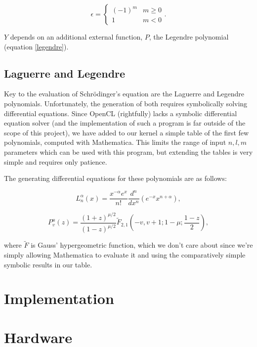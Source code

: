 \documentclass{acmsiggraph}
\begin{document}
\begin{equation}\label{yEpsilon}
\epsilon=\begin{cases}
\left(-1\right)^m & \text{$m\ge0$} \\
1 & \text{$m<0$}
\end{cases}.
\end{equation}

$Y$ depends on an additional external function, $P$, the Legendre polynomial (equation \ref{legendre}).

\subsection{Laguerre and Legendre\label{laguerreLegendre}}

Key to the evaluation of Schr\"{o}dinger's equation are the Laguerre and Legendre polynomials. Unfortunately, the generation of both requires symbolically solving differential equations. Since OpenCL (rightfully) lacks a symbolic differential equation solver (and the implementation of such a program is far outside of the scope of this project), we have added to our kernel a simple table of the first few polynomials, computed with Mathematica. This limits the range of input $n, l, m$ parameters which can be used with this program, but extending the tables is very simple and requires only patience.

The generating differential equations for these polynomials are as follows:

\begin{equation}\label{laguerre}
L^\alpha_n\left(x\right)=\frac{x^{-\alpha}e^x}{n!}\frac{d^n}{dx^n}\left(e^{-x}x^{n+\alpha}\right),
\end{equation}

\begin{equation}\label{legendre}
P^u_v\left(z\right)=\frac{\left(1+z\right)^{\mu/2}}{\left(1-z\right)^{\mu/2}}
\tilde{F}_{2,1}
\left(-v,v+1;1-\mu;\frac{1-z}{2}\right),
\end{equation}

where $\tilde{F}$ is Gauss' hypergeometric function, which we don't care about since we're simply allowing Mathematica to evaluate it and using the comparatively simple symbolic results in our table.

\section{Implementation}

\section{Hardware}
\end{document}
